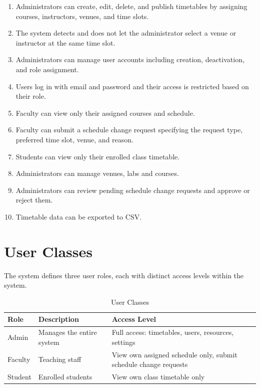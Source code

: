 \documentclass[12pt, a4paper]{report}
\begin{document}
\begin{enumerate}
    \item Administrators can create, edit, delete, and publish timetables by assigning courses, instructors, venues, and time slots.
    \item The system detects and does not let the administrator select a venue or instructor at the same time slot.
    \item Administrators can manage user accounts including creation, deactivation, and role assignment.
    \item Users log in with email and password and their access is restricted based on their role.
    \item Faculty can view only their assigned courses and schedule.
    \item Faculty can submit a schedule change request specifying the request type, preferred time slot, venue, and reason.
    \item Students can view only their enrolled class timetable.
    \item Administrators can manage venues, labs and courses.
    \item Administrators can review pending schedule change requests and approve or reject them.
    \item Timetable data can be exported to CSV.
\end{enumerate}

\section{User Classes}
The system defines three user roles, each with distinct access levels within the system.

\vspace{0.5em}
\begin{table}[H]
\centering
\small
\begin{tabular}{@{} p{2.5cm} p{4.5cm} p{6.5cm} @{}}
\toprule
\textbf{Role} & \textbf{Description} & \textbf{Access Level} \\
\midrule
Admin & Manages the entire system & Full access: timetables, users, resources, settings \\
\addlinespace
Faculty & Teaching staff & View own assigned schedule only, submit schedule change requests \\
\addlinespace
Student & Enrolled students & View own class timetable only \\
\bottomrule
\end{tabular}
\caption{User Classes}
\label{tab:roles-access}
\end{table}
\end{document}

